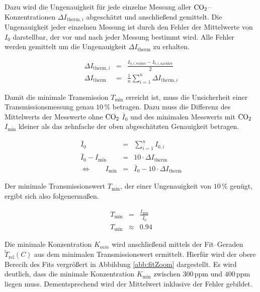 \documentclass[12pt,a4paper]{scrartcl}
\numberwithin{equation}{section} %
\begin{document}
Dazu wird die Ungenauigkeit für jede einzelne Messung aller $\ce{CO_2}$--Konzentrationen $\Delta I_{\mathrm{therm}, i}$ abgeschätzt und anschließend gemittelt. Die Ungenauigkeit jeder einzelnen Messung ist durch den Fehler der Mittelwerte von $I_0$ darstellbar, der vor und nach jeder Messung bestimmt wird. Alle Fehler werden gemittelt um die Ungenauigkeit $\Delta I_\mathrm{therm}$ zu erhalten.

\begin{eqnarray}
	\Delta I_{\mathrm{therm}, i} &=& \frac{I_{0, i, \mathrm{vorher}} - I_{0, i, \mathrm{nachher}}}{2} \\
	\Delta I_\mathrm{therm} &=& \frac{1}{n} \sum_{i = 1}^{n} \Delta I_{\mathrm{therm}, i}
\end{eqnarray}

\noindent
Damit die minimale Transmission $T_\mathrm{min}$ erreicht ist, muss die Unsicherheit einer Transmissionsmessung genau $10 \mathrm{\, \%}$ betragen. Dazu muss die Differenz des Mittelwerts der Messwerte ohne $\ce{CO_2}$ $\bar{I}_{0}$ und des minimalen Messwerts mit $\ce{CO_2}$ $I_\mathrm{min}$ kleiner als das zehnfache der oben abgeschätzten Genauigkeit betragen.

\begin{eqnarray}
	\bar{I}_0 &=& \sum_{i=1}^{n} I_{0, i} \\
	\bar{I}_0 - I_\mathrm{min} &=& 10 \cdot \Delta I_\mathrm{therm} \\
	\Leftrightarrow \qquad I_\mathrm{min} &=& \bar{I}_0 - 10 \cdot \Delta I_\mathrm{therm}
\end{eqnarray}

\noindent
Der minimale Transmissionswert $T_\mathrm{min}$, der einer Ungenauigkeit von $10 \mathrm{\, \%}$ genügt, ergibt sich also folgenermaßen.

\begin{eqnarray}
	T_\mathrm{min} &=& \frac{I_\mathrm{min}}{\bar{I}_0} \\
	T_\mathrm{min} &\approx& 0.94
\end{eqnarray}

\noindent
Die minimale Konzentration $K_{min}$ wird anschließend mittels der Fit--Geraden $\tilde{T}_\mathrm{rel}(C)$ aus dem minimalen Transmissionswert ermittelt. Hierfür wird der obere Berecih des Fits vergrößert in Abbildung \ref{abb:fitZoom} dargestellt. Es wird deutlich, dass die minimale Konzentration $K_\mathrm{min}$ zwischen $300 \mathrm{\, ppm}$ und $400 \mathrm{\, ppm}$ liegen muss. Dementsprechend wird der Mittelwert inklusive der Fehler gebildet.
\end{document}
